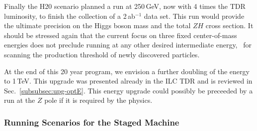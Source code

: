 Finally the H20 scenario planned a run at 250\,GeV, now with 4 times the TDR luminosity, to finish the collection of a 2\,ab$^{-1}$ data set.   This run would provide the ultimate precision on the Higgs boson mass and the total $ZH$ cross section. It should be stressed again that the current focus on three fixed center-of-mass energies does not preclude running at any other desired intermediate energy, \eg\ for scanning the production threshold of newly discovered particles.

At the end of this 20 year program, we envision  a further doubling of the energy to 1\,TeV.   This upgrade was presented already 
in the ILC TDR and is reviewed in Sec.~\ref{subsubsec:upg-optE}.  This energy upgrade could  possibly be preceeded by a run at the $Z$ pole if it is  required by the  physics.

\subsubsection{Running Scenarios for the Staged Machine}

